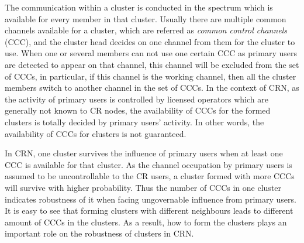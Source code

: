 \documentclass[journal,comsoc]{IEEEtran}
\theoremstyle{mytheoremstyle}
\theoremstyle{mytheoremstyle}
\theoremstyle{mytheoremstyle}
\newcommand{\ie}{i.e., }
\begin{document}

The communication within a cluster is conducted in the spectrum which is available for every member in that cluster.
Usually there are multiple common channels available for a cluster, which are referred as \textit{common control channels} (CCC), and the cluster head decides on one channel from them for the cluster to use.
When one or several members can not use one certain CCC as primary users are detected to appear on that channel, this channel will be excluded from the set of CCCs, in particular, if this channel is the working channel, then all the cluster members switch to another channel in the set of CCCs.
In the context of CRN, as the activity of primary users is controlled by licensed operators which are generally not known to CR nodes, the availability of CCCs for the formed clusters  is totally decided by primary users' activity.
In other words, the availability of CCCs for clusters is not guaranteed. 


In CRN, one cluster survives the influence of primary users when at least one CCC is available for that cluster.
As the channel occupation by primary users is assumed to be uncontrollable to the CR users, a cluster formed with more CCCs will survive with higher probability.
Thus the number of CCCs in one cluster indicates robustness of it when facing ungovernable influence from primary users.
It is easy to see that forming clusters with different neighbours leads to different amount of CCCs in the clusters.
As a result, how to form the clusters plays an important role on the robustness of clusters in CRN.
\end{document}
